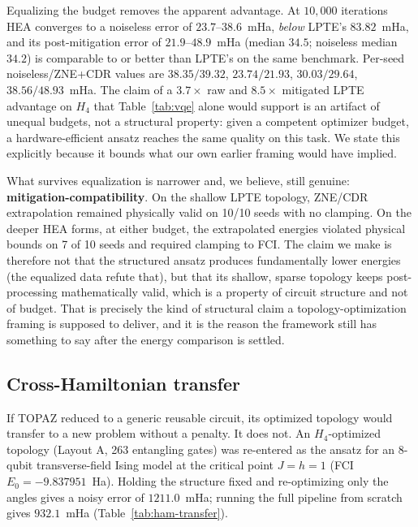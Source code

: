 \documentclass[twocolumn,aps,prl,superscriptaddress,showkeys]{revtex4-2}
\theoremstyle{plain}
\theoremstyle{definition}
\begin{document}
Equalizing the budget removes the apparent advantage. At $10{,}000$ iterations HEA converges to a noiseless error of $23.7$--$38.6$~mHa, \emph{below} LPTE's $83.82$~mHa, and its post-mitigation error of $21.9$--$48.9$~mHa (median $34.5$; noiseless median $34.2$) is comparable to or better than LPTE's on the same benchmark. Per-seed noiseless/ZNE+CDR values are $38.35/39.32$, $23.74/21.93$, $30.03/29.64$, $38.56/48.93$~mHa. The claim of a $3.7\times$ raw and $8.5\times$ mitigated LPTE advantage on $H_4$ that Table~\ref{tab:vqe} alone would support is an artifact of unequal budgets, not a structural property: given a competent optimizer budget, a hardware-efficient ansatz reaches the same quality on this task. We state this explicitly because it bounds what our own earlier framing would have implied.

What survives equalization is narrower and, we believe, still genuine: \textbf{mitigation-compatibility}. On the shallow LPTE topology, ZNE/CDR extrapolation remained physically valid on 10/10 seeds with no clamping. On the deeper HEA forms, at either budget, the extrapolated energies violated physical bounds on 7 of 10 seeds and required clamping to FCI. The claim we make is therefore not that the structured ansatz produces fundamentally lower energies (the equalized data refute that), but that its shallow, sparse topology keeps post-processing mathematically valid, which is a property of circuit structure and not of budget. That is precisely the kind of structural claim a topology-optimization framing is supposed to deliver, and it is the reason the framework still has something to say after the energy comparison is settled.

\subsection{Cross-Hamiltonian transfer}

If TOPAZ reduced to a generic reusable circuit, its optimized topology would transfer to a new problem without a penalty. It does not. An $H_4$-optimized topology (Layout A, 263 entangling gates) was re-entered as the ansatz for an 8-qubit transverse-field Ising model at the critical point $J=h=1$ (FCI $E_0=-9.837951$~Ha). Holding the structure fixed and re-optimizing only the angles gives a noisy error of $1211.0$~mHa; running the full pipeline from scratch gives $932.1$~mHa (Table~\ref{tab:ham-transfer}).
\end{document}
